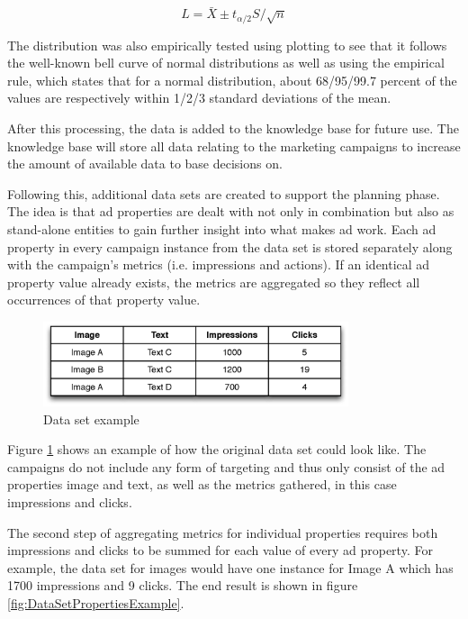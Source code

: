 \documentclass[11pt,a4paper]{report}
\begin{document}
\begin{equation}
	L = \bar{X} \pm t_{\alpha/2} S/\sqrt{n}
	\label{eq:IntervalLimitsUnknownVariance}
\end{equation}

The distribution was also empirically tested using plotting to see that it follows the well-known bell curve of normal distributions as well as using the empirical rule, which states that for a normal distribution, about 68/95/99.7 percent of the values are respectively within 1/2/3 standard deviations of the mean.

After this processing, the data is added to the knowledge base for future use. The knowledge base will store all data relating to the marketing campaigns to increase the amount of available data to base decisions on.

Following this, additional data sets are created to support the planning phase. The idea is that ad properties are dealt with not only in combination but also as stand-alone entities to gain further insight into what makes ad work. Each ad property in every campaign instance from the data set is stored separately along with the campaign's metrics (i.e. impressions and actions). If an identical ad property value already exists, the metrics are aggregated so they reflect all occurrences of that property value.

\begin{figure}[htb] \centering \includegraphics[width=0.8\textwidth]{data-set-example.eps}
	\caption{Data set example}
	\label{fig:DataSetExample}
\end{figure}

Figure \ref{fig:DataSetExample} shows an example of how the original data set could look like. The campaigns do not include any form of targeting and thus only consist of the ad properties image and text, as well as the metrics gathered, in this case impressions and clicks.

The second step of aggregating metrics for individual properties requires both impressions and clicks to be summed for each value of every ad property. For example, the data set for images would have one instance for Image A which has 1700 impressions and 9 clicks. The end result is shown in figure \ref{fig:DataSetPropertiesExample}.
\end{document}
